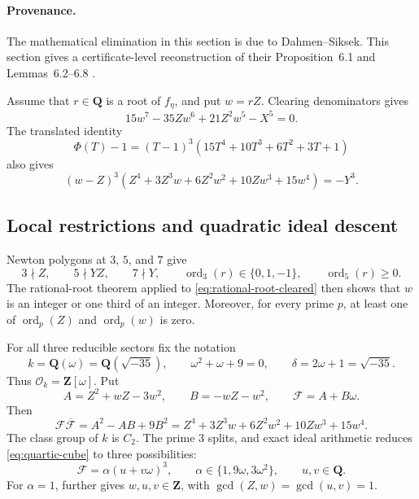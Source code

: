 \documentclass[11pt]{article}
\newcommand{\Q}{\mathbf Q}
\newcommand{\Z}{\mathbf Z}
\newcommand{\OO}{\mathcal O}
\newcommand{\ord}{\operatorname{ord}}
\theoremstyle{definition}
\theoremstyle{remark}
\begin{document}
\paragraph{Provenance.}
The mathematical elimination in this section is due to Dahmen--Siksek.  This
section gives a certificate-level reconstruction of their
Proposition~6.1 and Lemmas~6.2--6.8 \cite[Section~6]{DahmenSiksek}.

Assume that $r\in\Q$ is a root of $f_\eta$, and put $w=rZ$.
Clearing denominators gives
\begin{equation}\label{eq:rational-root-cleared}
       15w^7-35Zw^6+21Z^2w^5-X^5=0.
\end{equation}
The translated identity
\[
 \Phi(T)-1=(T-1)^3(15T^4+10T^3+6T^2+3T+1)
\]
also gives
\begin{equation}\label{eq:quartic-cube}
 (w-Z)^3
 (Z^4+3Z^3w+6Z^2w^2+10Zw^3+15w^4)=-Y^3.
\end{equation}

\subsection{Local restrictions and quadratic ideal descent}

Newton polygons at $3$, $5$, and $7$ give
\begin{equation}\label{eq:rational-local}
 3\nmid Z,\qquad 5\nmid YZ,\qquad 7\nmid Y,\qquad
 \ord_3(r)\in\{0,1,-1\},\qquad \ord_5(r)\geq0.
\end{equation}
The rational-root theorem applied to \eqref{eq:rational-root-cleared}
then shows that $w$ is an integer or one third of an integer.  Moreover, for
every prime $p$, at least one of $\ord_p(Z)$ and $\ord_p(w)$ is zero.

For all three reducible sectors fix the notation
\begin{equation}\label{eq:k-minus35}
 k=\Q(\omega)=\Q(\sqrt{-35}),\qquad
 \omega^2+\omega+9=0,\qquad \delta=2\omega+1=\sqrt{-35}.
\end{equation}
Thus $\OO_k=\Z[\omega]$.  Put
\[
 A=Z^2+wZ-3w^2,\qquad B=-wZ-w^2,\qquad \mathcal F=A+B\omega.
\]
Then
\[
 \mathcal F\overline{\mathcal F}=A^2-AB+9B^2
        =Z^4+3Z^3w+6Z^2w^2+10Zw^3+15w^4.
\]
The class group of $k$ is $C_2$.  The prime $3$ splits, and exact ideal
arithmetic reduces \eqref{eq:quartic-cube} to three possibilities:
\begin{equation}\label{eq:three-cubic-cases}
 \mathcal F=\alpha(u+v\omega)^3,\qquad
               \alpha\in\{1,9\omega,3\omega^2\},\qquad u,v\in\Q.
\end{equation}
For $\alpha=1$, \cite[Lemma~6.4]{DahmenSiksek} further gives
$w,u,v\in\Z$, with $\gcd(Z,w)=\gcd(u,v)=1$.
\end{document}
